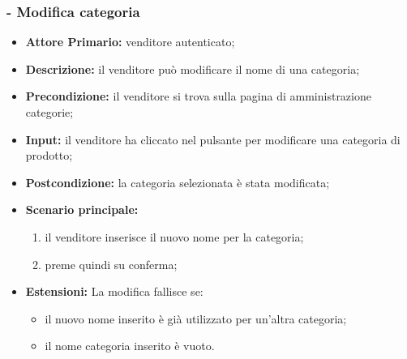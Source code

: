 \subsubsection{- Modifica categoria}
\begin{itemize}
    \item \textbf{Attore Primario:} venditore autenticato;
    \item \textbf{Descrizione:} il venditore può modificare il nome di una categoria;
    \item \textbf{Precondizione:} il venditore si trova sulla pagina di amministrazione categorie;
    \item \textbf{Input:} il venditore ha cliccato nel pulsante per modificare una categoria di prodotto;
    \item \textbf{Postcondizione:} la categoria selezionata è stata modificata;
    \item \textbf{Scenario principale:}
          \begin{enumerate}
              \item il venditore inserisce il nuovo nome per la categoria;
              \item preme quindi su conferma;
          \end{enumerate}
    \item \textbf{Estensioni:} La modifica fallisce se:
          \begin{itemize}
              \item il nuovo nome inserito è già utilizzato per un'altra categoria;
              \item il nome categoria inserito è vuoto.
          \end{itemize}
\end{itemize}

\stepsubUserCase
